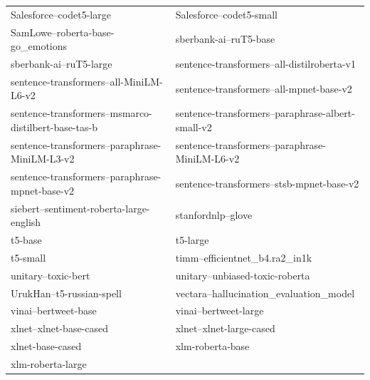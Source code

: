 \documentclass{fairmeta}
\begin{document}
\begin{longtable}{p{} p{}}
Salesforce--codet5-large & Salesforce--codet5-small \\
SamLowe--roberta-base-go\_emotions & sberbank-ai--ruT5-base \\
sberbank-ai--ruT5-large & sentence-transformers--all-distilroberta-v1 \\
sentence-transformers--all-MiniLM-L6-v2 & sentence-transformers--all-mpnet-base-v2 \\
sentence-transformers--msmarco-distilbert-base-tas-b & sentence-transformers--paraphrase-albert-small-v2 \\
sentence-transformers--paraphrase-MiniLM-L3-v2 & sentence-transformers--paraphrase-MiniLM-L6-v2 \\
sentence-transformers--paraphrase-mpnet-base-v2 & sentence-transformers--stsb-mpnet-base-v2 \\
siebert--sentiment-roberta-large-english & stanfordnlp--glove \\
t5-base & t5-large \\
t5-small & timm--efficientnet\_b4.ra2\_in1k \\
unitary--toxic-bert & unitary--unbiased-toxic-roberta \\
UrukHan--t5-russian-spell & vectara--hallucination\_evaluation\_model \\
vinai--bertweet-base & vinai--bertweet-large \\
xlnet--xlnet-base-cased & xlnet--xlnet-large-cased \\
xlnet-base-cased & xlm-roberta-base \\
xlm-roberta-large & \\

\end{longtable}
\end{document}

